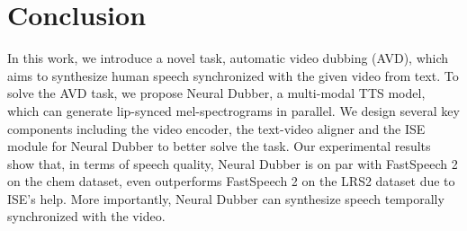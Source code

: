 \documentclass{article}
\begin{document}
\section{Conclusion}
In this work, we introduce a novel task, automatic video dubbing (AVD), which aims to synthesize human speech synchronized with the given video from text.
To solve the AVD task, we propose Neural Dubber, a multi-modal TTS model, which can generate lip-synced mel-spectrograms in parallel. 
We design several key components including the video encoder, the text-video aligner and the ISE module for Neural Dubber to better solve the task.
Our experimental results show that, in terms of speech quality, Neural Dubber is on par with FastSpeech 2 on the chem dataset, even outperforms FastSpeech 2 on the LRS2 dataset due to ISE's help. More importantly, Neural Dubber can synthesize speech temporally synchronized with the video.




\end{document}
